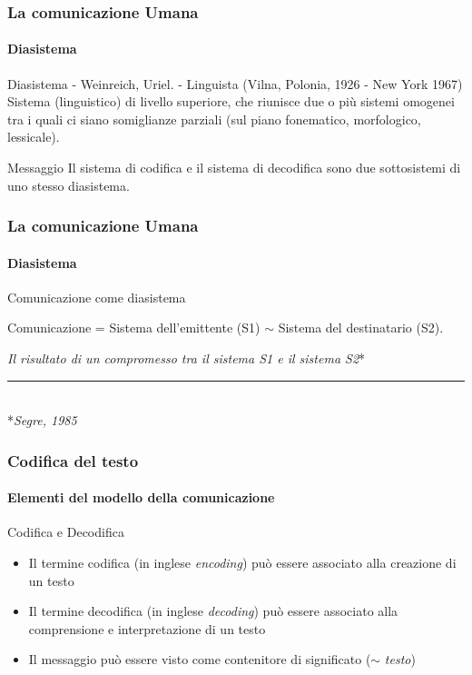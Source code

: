 \begin{frame}
	\frametitle{La comunicazione Umana}
	\framesubtitle{Diasistema}
	\addtocounter{nframe}{1}

	\begin{block}{Diasistema - Weinreich, Uriel. - Linguista (Vilna, Polonia, 1926 - New York 1967)}
		Sistema (linguistico) di livello superiore, che riunisce due o più sistemi omogenei tra i quali ci siano somiglianze parziali (sul piano fonematico, morfologico, lessicale).
	\end{block}

	\begin{block}{Messaggio}
		Il sistema di codifica e il sistema di decodifica sono due sottosistemi di uno stesso diasistema.
	\end{block}

\end{frame}

\begin{frame}
	\frametitle{La comunicazione Umana}
	\framesubtitle{Diasistema}
	\addtocounter{nframe}{1}

	\begin{block}{Comunicazione come diasistema}
		\begin{center}Comunicazione = Sistema dell'emittente (S1) $\sim$  Sistema del destinatario (S2).\end{center}
		\textit{Il risultato di un compromesso tra il sistema S1 e il sistema S2}*
	\end{block}

	\rule{7cm}{0.015cm}
	\\*\tiny\textit{Segre, 1985}
\end{frame}

\begin{frame}
	\frametitle{Codifica del testo}
	\framesubtitle{Elementi del modello della comunicazione}
	\addtocounter{nframe}{1}

	\begin{block}{Codifica e Decodifica}
		\begin{itemize}
			\item Il termine codifica (in inglese \textit{encoding}) può essere associato alla creazione di un testo
			\item Il termine decodifica (in inglese \textit{decoding}) può essere associato alla comprensione e interpretazione di un testo
			\item Il messaggio può essere visto come contenitore di significato ($\sim$ \textit{testo})
		\end{itemize}
	\end{block}

\end{frame}


